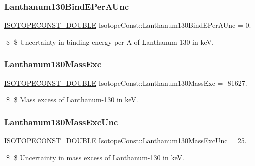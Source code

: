 \subsubsection{\texorpdfstring{Lanthanum130\+Bind\+E\+Per\+A\+Unc}{Lanthanum130BindEPerAUnc}}
{\footnotesize\ttfamily \mbox{\hyperlink{group___isotope_const-_macros_ga8f45a7272ce02c0b4c65c44636ed719a}{I\+S\+O\+T\+O\+P\+E\+C\+O\+N\+S\+T\+\_\+\+D\+O\+U\+B\+LE}} Isotope\+Const\+::\+Lanthanum130\+Bind\+E\+Per\+A\+Unc = 0.}

\$ \$ Uncertainty in binding energy per A of Lanthanum-\/130 in keV. \mbox{\label{group___isotope_const-_lanthanum-_la130_ga249bced2b103540bc4a73bc37ecb31fc}} 
\subsubsection{\texorpdfstring{Lanthanum130\+Mass\+Exc}{Lanthanum130MassExc}}
{\footnotesize\ttfamily \mbox{\hyperlink{group___isotope_const-_macros_ga8f45a7272ce02c0b4c65c44636ed719a}{I\+S\+O\+T\+O\+P\+E\+C\+O\+N\+S\+T\+\_\+\+D\+O\+U\+B\+LE}} Isotope\+Const\+::\+Lanthanum130\+Mass\+Exc = -\/81627.}

\$ \$ Mass excess of Lanthanum-\/130 in keV. \mbox{\label{group___isotope_const-_lanthanum-_la130_gac2460272e20d421691daaa5178273ad5}} 
\subsubsection{\texorpdfstring{Lanthanum130\+Mass\+Exc\+Unc}{Lanthanum130MassExcUnc}}
{\footnotesize\ttfamily \mbox{\hyperlink{group___isotope_const-_macros_ga8f45a7272ce02c0b4c65c44636ed719a}{I\+S\+O\+T\+O\+P\+E\+C\+O\+N\+S\+T\+\_\+\+D\+O\+U\+B\+LE}} Isotope\+Const\+::\+Lanthanum130\+Mass\+Exc\+Unc = 25.}

\$ \$ Uncertainty in mass excess of Lanthanum-\/130 in keV. \mbox{\label{group___isotope_const-_lanthanum-_la130_ga3d498c381437c4ffa574312b6012c5a6}} 
